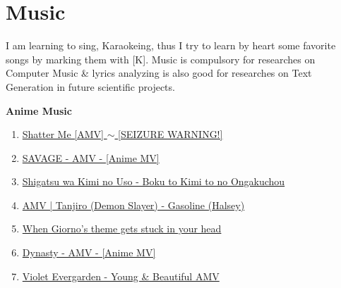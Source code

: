 \documentclass{article}
\begin{document}

\section{Music}
I am learning to sing, Karaokeing, thus I try to learn by heart some favorite songs by marking them with [K]. Music is compulsory for researches on Computer Music \& lyrics analyzing is also good for researches on Text Generation in future scientific projects.

{\bf Anime Music}
\begin{enumerate}
	\item \href{https://www.youtube.com/watch?v=21nlozmIbP0}{Shatter Me [AMV] $\sim$ [SEIZURE WARNING!]}
	\item \href{https://www.youtube.com/watch?v=80fcg329zBY}{SAVAGE - AMV - [Anime MV]}
	\item \href{https://www.youtube.com/watch?v=i0Q7T_9vNNE}{Shigatsu wa Kimi no Uso - Boku to Kimi to no Ongakuchou}
	\item \href{https://www.youtube.com/watch?v=Gm-ywPzO0NA}{AMV | Tanjiro (Demon Slayer) - Gasoline (Halsey)}
	\item \href{https://www.youtube.com/watch?v=ZyCPOWdudiw}{When Giorno's theme gets stuck in your head}
	\item \href{https://www.youtube.com/watch?v=oxkgOEiE_HY}{Dynasty - AMV - [Anime MV]}
	\item \href{https://www.youtube.com/watch?v=TWEFFbh7rn0}{Violet Evergarden - Young \& Beautiful AMV}
\end{enumerate}
\end{document}
